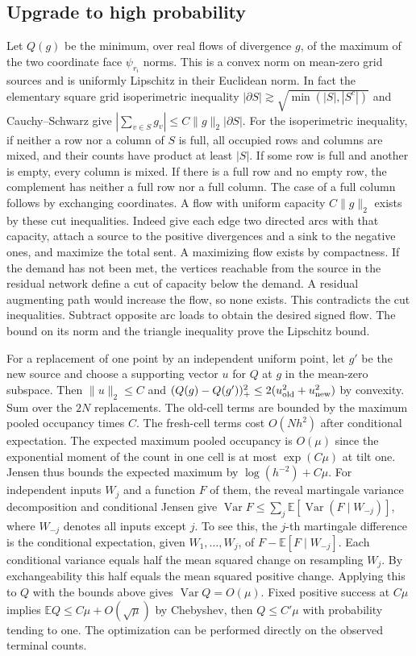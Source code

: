 \documentclass[11pt]{article}
\newcommand{\E}{\mathbb E}
\begin{document}
\subsection*{Upgrade to high probability}
Let \(Q(g)\) be the minimum, over real flows of divergence \(g\),
of the maximum of the two coordinate face \(\psi_{r_i}\) norms.
This is a convex norm on mean-zero grid sources and is uniformly
Lipschitz in their Euclidean norm. In fact the elementary square
grid isoperimetric inequality
\(|\partial S|\gtrsim\sqrt{\min(|S|,|S^c|)}\) and Cauchy--Schwarz
give \(|\sum_{v\in S}g_v|\le C\|g\|_2|\partial S|\).
For the isoperimetric inequality, if neither a row nor a column
of \(S\) is full, all occupied rows and columns are mixed,
and their counts have product at least \(|S|\).
If some row is full and another is empty, every column is
mixed. If there is a full row and no empty row, the complement
has neither a full row nor a full column. The case of a full
column follows by exchanging coordinates. A flow with uniform capacity \(C\|g\|_2\) exists by these
cut inequalities. Indeed give each edge two directed arcs
with that capacity, attach a source to the positive
divergences and a sink to the negative ones, and maximize
the total sent. A maximizing flow exists by compactness.
If the demand has not been met, the vertices reachable
from the source in the residual network define a cut
of capacity below the demand. A residual augmenting path
would increase the flow, so none exists. This contradicts
the cut inequalities. Subtract opposite arc loads to
obtain the desired signed flow. The bound on its norm
and the triangle inequality prove the Lipschitz bound.

For a replacement of one point by an independent uniform
point, let \(g'\) be the new source and choose a supporting
vector \(u\) for \(Q\) at \(g\) in the mean-zero subspace.
Then \(\|u\|_2\le C\) and
\((Q(g)-Q(g'))_+^2\le 2(u_{\rm old}^2+u_{\rm new}^2)\)
by convexity. Sum over the \(2N\) replacements.
The old-cell terms are bounded by the maximum pooled occupancy
times \(C\). The fresh-cell terms cost \(O(Nh^2)\) after
conditional expectation. The expected maximum pooled occupancy is
\(O(\mu)\) since the exponential moment of the count in one cell is
at most \(\exp(C\mu)\) at tilt one. Jensen thus bounds the expected
maximum by \(\log(h^{-2})+C\mu\).
For independent inputs \(W_j\) and a function \(F\) of them,
the reveal martingale variance decomposition and conditional
Jensen give
\(\operatorname{Var}F\le\sum_j \E[\operatorname{Var}(F\mid W_{-j})]\),
where \(W_{-j}\) denotes all inputs except \(j\).
To see this, the \(j\)-th martingale difference is the
conditional expectation, given \(W_1,\ldots,W_j\), of
\(F-\E[F\mid W_{-j}]\). Each conditional variance equals half
the mean squared change on resampling \(W_j\).
By exchangeability this half equals the mean squared
positive change. Applying this to \(Q\) with the bounds
above gives \(\operatorname{Var}Q=O(\mu)\).
Fixed positive success at \(C\mu\) implies
\(\E Q\le C\mu+O(\sqrt\mu)\) by Chebyshev, then
\(Q\le C'\mu\) with probability tending to one.
The optimization can be performed directly on the observed
terminal counts.
\end{document}
